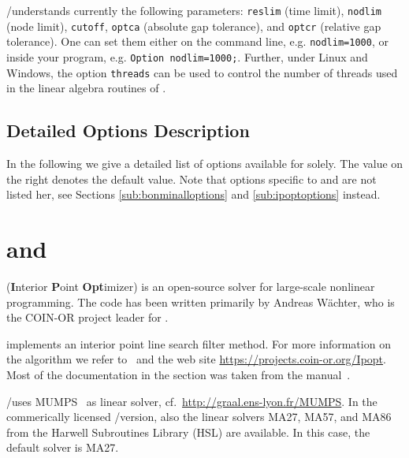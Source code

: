 \GAMS/\COUENNE understands currently the following \GAMS parameters: \texttt{reslim} (time limit), \texttt{nodlim} (node limit), \texttt{cutoff}, \texttt{optca} (absolute gap tolerance), and \texttt{optcr} (relative gap tolerance).
One can set them either on the command line, e.g. \verb+nodlim=1000+, or inside your \GAMS program, e.g. \verb+Option nodlim=1000;+.
Further, under Linux and Windows, the option \texttt{threads} can be used to control the number of threads used in the linear algebra routines of \IPOPT.

\subsection{Detailed Options Description}
\label{sub:couenneoptions}

In the following we give a detailed list of options available for \COUENNE solely.
The value on the right denotes the default value.
Note that options specific to \IPOPT and \BONMIN are not listed her, see Sections \ref{sub:bonminalloptions} and \ref{sub:ipoptoptions} instead.



\section{\IPOPT and \IPOPTH}


\IPOPT (\textbf{I}nterior \textbf{P}oint \textbf{Opt}imizer) is an open-source solver for large-scale nonlinear programming.
The code has been written primarily by Andreas W\"achter, who is the COIN-OR project leader for \IPOPT.

\IPOPT implements an interior point line search filter method.
For more information on the algorithm we refer to~\cite{NoWaWa08,Waechter2002,WaBi05b,WaBi05a,WaBi2006} and the \IPOPT web site \url{https://projects.coin-or.org/Ipopt}.
Most of the \IPOPT documentation in the section was taken from the \IPOPT manual~\cite{IpoptManual}.

\GAMS/\IPOPT uses \textsc{MUMPS}~\cite{AmestoyDuffKosterLExcellent2001,AmestoyGuermoucheLExcellentPralet2006} as linear solver, cf.~\url{http://graal.ens-lyon.fr/MUMPS}.
In the commerically licensed \GAMS/\IPOPTH version, also the linear solvers \textsc{MA27}, \textsc{MA57}, and \textsc{MA86} from the Harwell Subroutines Library (HSL) are available.
In this case, the default solver is MA27.

